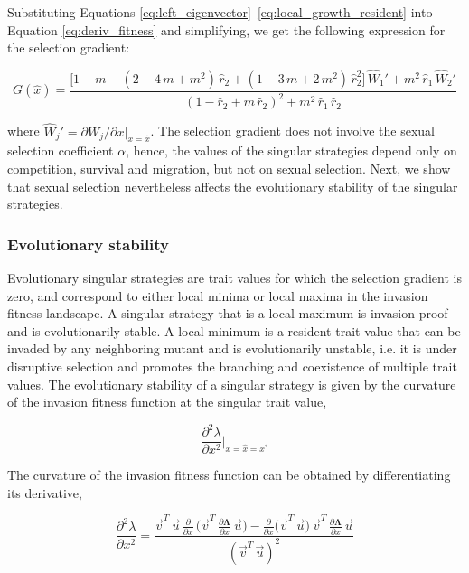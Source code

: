 Substituting Equations \ref{eq:left_eigenvector}--\ref{eq:local_growth_resident} into Equation \ref{eq:deriv_fitness} and simplifying, we get the following expression for the selection gradient:

\begin{equation}
    G(\hat{x}) = \frac{\big[1-m-(2-4\,m+m^2)\,\hat{r}_2+(1-3\,m+2\,m^2)\,\hat{r}^2_2\big]\, \hat{W}_1' + m^2\,\hat{r}_1\,\hat{W}_2'}{(1-\hat{r}_2+m\,\hat{r}_2)^2 + m^2\,\hat{r}_1\,\hat{r}_2}
    \label{eq:fitness_gradient_expression}
\end{equation}

where $\hat{W}_j' = \partial W_j / \partial x |_{x = \hat{x}}$. The selection gradient does not involve the sexual selection coefficient $\alpha$, hence, the values of the singular strategies depend only on competition, survival and migration, but not on sexual selection. Next, we show that sexual selection nevertheless affects the evolutionary stability of the singular strategies.

\subsubsection*{Evolutionary stability}

Evolutionary singular strategies are trait values for which the selection gradient is zero, and correspond to either local minima or local maxima in the invasion fitness landscape. A singular strategy that is a local maximum is invasion-proof and is evolutionarily stable. A local minimum is a resident trait value that can be invaded by any neighboring mutant and is evolutionarily unstable, i.e. it is under disruptive selection and promotes the branching and coexistence of multiple trait values. The evolutionary stability of a singular strategy is given by the curvature of the invasion fitness function at the singular trait value,

\begin{equation}
    \frac{\partial^2 \lambda}{\partial x^2}\bigg|_{x=\hat{x}=x^*}
\end{equation}

The curvature of the invasion fitness function can be obtained by differentiating its derivative,

\begin{equation}
    \frac{\partial^2 \lambda}{\partial x^2} = \frac{\overrightarrow{v}^T\,\overrightarrow{u}\,\frac{\partial}{\partial x}\,\big(\overrightarrow{v}^T\,\frac{\partial \pmb{\Lambda}}{\partial x}\,\overrightarrow{u}\big) - \frac{\partial}{\partial x} \big( \overrightarrow{v}^T \, \overrightarrow{u} \big) \, \overrightarrow{v}^T \, \frac{\partial \pmb{\Lambda}}{\partial x}\,\overrightarrow{u}}{(\overrightarrow{v}^T\,\overrightarrow{u})^2}
\end{equation}

